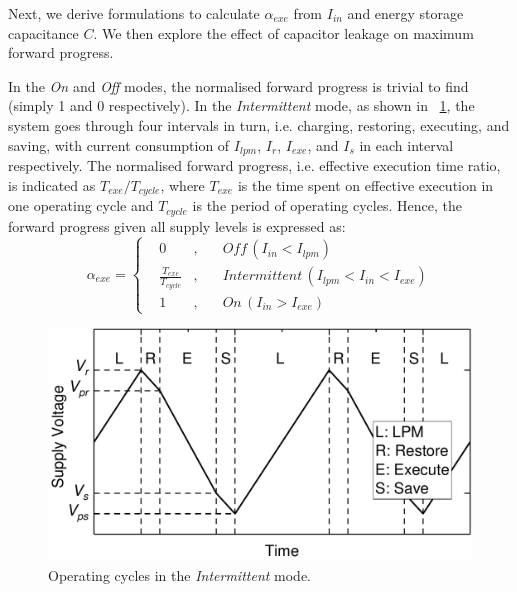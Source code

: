 Next, we derive formulations to calculate $\alpha_{exe}$ from $I_{in}$ and energy storage capacitance $C$. We then explore the effect of capacitor leakage on maximum forward progress. 

In the \textit{On} and \textit{Off} modes, the normalised forward progress is trivial to find (simply 1 and 0 respectively). In the \textit{Intermittent} mode,  as shown in \figurename{~\ref{fig:operatingCycle}}, the system goes through four intervals in turn, i.e. charging, restoring, executing, and saving, with current consumption of $I_{lpm}$, $I_{r}$, $I_{exe}$, and $I_{s}$ in each interval respectively. The normalised forward progress, i.e. effective execution time ratio, is indicated as $T_{exe} / T_{cycle}$, where $T_{exe}$ is the time spent on effective execution in one operating cycle and $T_{cycle}$ is the period of operating cycles. Hence, the forward progress given all supply levels is expressed as:
\begin{equation}
    \alpha_{exe} = \left\{
    \begin{aligned}
        & 0 & , & \quad \textit{Off} \, (I_{in} < I_{lpm}) \\
        & \frac{T_{exe}}{T_{cycle}} & , & \quad \textit{Intermittent} \, (I_{lpm} < I_{in} < I_{exe}) \\
        & 1 & , & \quad \textit{On} \, (I_{in} > I_{exe})
    \end{aligned}
    \right.
    \label{eq:feff}
\end{equation}

\begin{figure}[!t]
  \centering
  \includegraphics[width=0.8\columnwidth]{ch3_sizingeffect/figures/CRESdemoFig}
  \caption{Operating cycles in the \textit{Intermittent} mode. }
  \label{fig:operatingCycle}
\end{figure}

